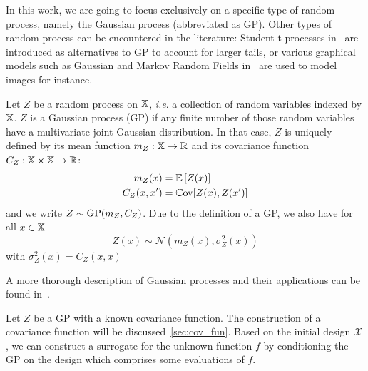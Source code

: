 \documentclass[../../Main_ManuscritThese.tex]{subfiles}
\begin{document}
In this work, we are going to focus exclusively on a specific type of
random process, namely the Gaussian process (abbreviated as GP). Other
types of random process can be encountered in the literature: Student
t-processes in~\cite{shah_student-t_2014} are introduced as
alternatives to GP to account for larger tails, or various graphical
models such as Gaussian and Markov Random Fields
in~\cite{bishop_pattern_2006,li_markov_2009} are used to model images
for instance.

\begin{definition}
  Let $Z$ be a random process on $\mathbb{X}$, \textit{i.e}. a collection
  of random variables indexed by $\mathbb{X}$. $Z$ is a Gaussian process
  (GP) if any finite number of those random variables have a
  multivariate joint Gaussian distribution.  In that case, $Z$ is
  uniquely defined by its mean function
  $m_Z:\mathbb{X} \rightarrow \mathbb{R}$ and its covariance function
  $C_Z:\mathbb{X} \times \mathbb{X} \rightarrow \mathbb{R}$:
  \begin{align}
    m_Z(x) &= \mathbb{E}\left[Z(x)\right] \\
    C_Z(x, x^{\prime}) &= \mathbb{C}\mathrm{ov}[Z(x), Z(x^{\prime})]
  \end{align}
  and we write $Z \sim \operatorname{\mathrm{GP}}(m_Z, C_Z)$.
  Due to the definition of a GP, we also have for all $x\in \mathbb{X}$
  \begin{equation}
    Z(x) \sim \mathcal{N}(m_Z(x), \sigma^2_Z(x)) 
  \end{equation}
  with $\sigma_Z^2(x) = C_Z(x, x)$
\end{definition}
A more thorough description of Gaussian processes and their applications can be found in~\cite{rasmussen_gaussian_2006}.


Let $Z$ be a GP with a known covariance function. The construction of
a covariance function will be discussed~\cref{sec:cov_fun}.  Based on
the initial design $\mathcal{X}$, we can construct a surrogate for the
unknown function $f$ by conditioning the GP on the design which
comprises some evaluations of $f$.
\end{document}
